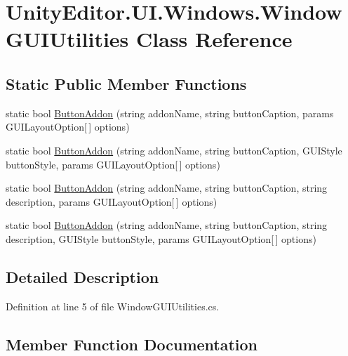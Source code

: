 \hypertarget{class_unity_editor_1_1_u_i_1_1_windows_1_1_window_g_u_i_utilities}{}\section{Unity\+Editor.\+U\+I.\+Windows.\+Window\+G\+U\+I\+Utilities Class Reference}
\label{class_unity_editor_1_1_u_i_1_1_windows_1_1_window_g_u_i_utilities}
\subsection*{Static Public Member Functions}
\begin{DoxyCompactItemize}
\item 
static bool \hyperlink{class_unity_editor_1_1_u_i_1_1_windows_1_1_window_g_u_i_utilities_abe5d139b9476667cd079a65ab1b27d9a}{Button\+Addon} (string addon\+Name, string button\+Caption, params G\+U\+I\+Layout\+Option\mbox{[}$\,$\mbox{]} options)
\item 
static bool \hyperlink{class_unity_editor_1_1_u_i_1_1_windows_1_1_window_g_u_i_utilities_a6001d5a3cc8fc63c662a085b10067303}{Button\+Addon} (string addon\+Name, string button\+Caption, G\+U\+I\+Style button\+Style, params G\+U\+I\+Layout\+Option\mbox{[}$\,$\mbox{]} options)
\item 
static bool \hyperlink{class_unity_editor_1_1_u_i_1_1_windows_1_1_window_g_u_i_utilities_a34cfc826f9ff9c3fac5644617cc194bc}{Button\+Addon} (string addon\+Name, string button\+Caption, string description, params G\+U\+I\+Layout\+Option\mbox{[}$\,$\mbox{]} options)
\item 
static bool \hyperlink{class_unity_editor_1_1_u_i_1_1_windows_1_1_window_g_u_i_utilities_a05353ca463ed76a317e79f7f46fe6c72}{Button\+Addon} (string addon\+Name, string button\+Caption, string description, G\+U\+I\+Style button\+Style, params G\+U\+I\+Layout\+Option\mbox{[}$\,$\mbox{]} options)
\end{DoxyCompactItemize}


\subsection{Detailed Description}


Definition at line 5 of file Window\+G\+U\+I\+Utilities.\+cs.



\subsection{Member Function Documentation}
\hypertarget{class_unity_editor_1_1_u_i_1_1_windows_1_1_window_g_u_i_utilities_abe5d139b9476667cd079a65ab1b27d9a}{}
